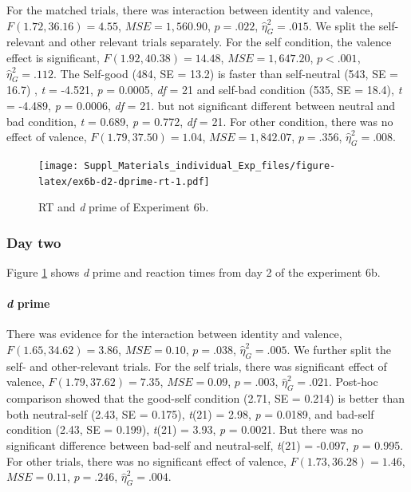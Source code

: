 \documentclass[
  english,
  man]{apa6}
\let\oldparagraph\paragraph
\renewcommand{\paragraph}[1]{\oldparagraph{#1}\mbox{}}
\begin{document}
For the matched trials, there was interaction between identity and valence, \(F(1.72, 36.16) = 4.55\), \(\mathit{MSE} = 1,560.90\), \(p = .022\), \(\hat{\eta}^2_G = .015\). We split the self-relevant and other relevant trials separately. For the self condition, the valence effect is significant, \(F(1.92, 40.38) = 14.48\), \(\mathit{MSE} = 1,647.20\), \(p < .001\), \(\hat{\eta}^2_G = .112\). The Self-good (484, SE = 13.2) is faster than self-neutral (543, SE = 16.7) , \emph{t} = -4.521, \emph{p} = 0.0005, \emph{df} = 21 and self-bad condition (535, SE = 18.4), \emph{t} = -4.489, \emph{p} = 0.0006, \emph{df} = 21. but not significant different between neutral and bad condition, \emph{t} = 0.689, \emph{p} = 0.772, \emph{df} = 21. For other condition, there was no effect of valence, \(F(1.79, 37.50) = 1.04\), \(\mathit{MSE} = 1,842.07\), \(p = .356\), \(\hat{\eta}^2_G = .008\).

\begin{figure}
\centering
\texttt{[image: Suppl\_Materials\_individual\_Exp\_files/figure-latex/ex6b-d2-dprime-rt-1.pdf]}
\caption{\label{fig:ex6b-d2-dprime-rt}RT and \emph{d} prime of Experiment 6b.}
\end{figure}

\hypertarget{day-two}{%
\subsubsection{Day two}\label{day-two}}

Figure \ref{fig:ex6b-d2-dprime-rt} shows \emph{d} prime and reaction times from day 2 of the experiment 6b.

\hypertarget{d-prime-9}{%
\paragraph{\texorpdfstring{\emph{d} prime}{d prime}}\label{d-prime-9}}

There was evidence for the interaction between identity and valence, \(F(1.65, 34.62) = 3.86\), \(\mathit{MSE} = 0.10\), \(p = .038\), \(\hat{\eta}^2_G = .005\). We further split the self- and other-relevant trials. For the self trials, there was significant effect of valence, \(F(1.79, 37.62) = 7.35\), \(\mathit{MSE} = 0.09\), \(p = .003\), \(\hat{\eta}^2_G = .021\). Post-hoc comparison showed that the good-self condition (2.71, SE = 0.214) is better than both neutral-self (2.43, SE = 0.175), \emph{t}(21) = 2.98, \emph{p} = 0.0189, and bad-self condition (2.43, SE = 0.199), \emph{t}(21) = 3.93, \emph{p} = 0.0021. But there was no significant difference between bad-self and neutral-self, \emph{t}(21) = -0.097, \emph{p} = 0.995. For other trials, there was no significant effect of valence, \(F(1.73, 36.28) = 1.46\), \(\mathit{MSE} = 0.11\), \(p = .246\), \(\hat{\eta}^2_G = .004\).
\end{document}

